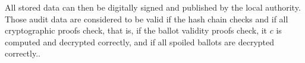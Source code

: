 All stored data can then be digitally signed and published by the
local authority. Those audit data are considered to be valid if the
hash chain checks and if all cryptographic proofs check, that is, if
the ballot validity proofs check, it $c$ is computed and decrypted
correctly, and if all spoiled ballots are decrypted correctly..






